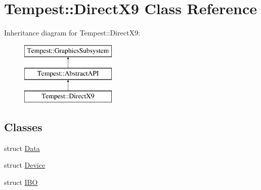 \hypertarget{class_tempest_1_1_direct_x9}{\section{Tempest\+:\+:Direct\+X9 Class Reference}
\label{class_tempest_1_1_direct_x9}
}
Inheritance diagram for Tempest\+:\+:Direct\+X9\+:\begin{figure}[H]
\begin{center}
\leavevmode
\includegraphics[height=3.000000cm]{class_tempest_1_1_direct_x9}
\end{center}
\end{figure}
\subsection*{Classes}
\begin{DoxyCompactItemize}
\item 
struct \hyperlink{struct_direct_x9_1_1_data}{Data}
\item 
struct \hyperlink{struct_direct_x9_1_1_device}{Device}
\item 
struct \hyperlink{struct_direct_x9_1_1_i_b_o}{I\+B\+O}
\end{DoxyCompactItemize}
